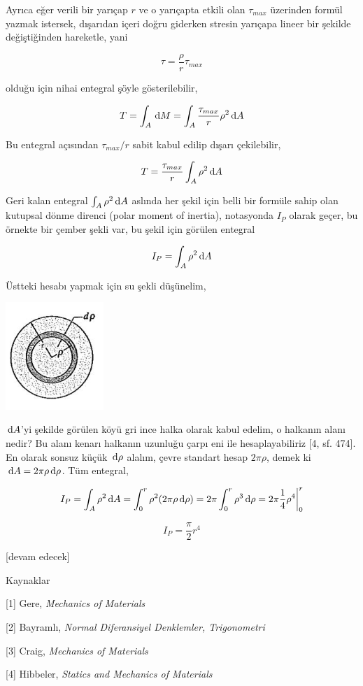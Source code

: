 \documentclass[12pt,fleqn]{article}\usepackage{../../common}
\begin{document}
Ayrıca eğer verili bir yarıçap $r$ ve o yarıçapta etkili olan $\tau_{max}$
üzerinden formül yazmak istersek, dışarıdan içeri doğru giderken stresin
yarıçapa lineer bir şekilde değiştiğinden hareketle, yani

$$
\tau = \frac{\rho}{r} \tau_{max}
$$

olduğu için nihai entegral şöyle gösterilebilir,

$$
T = \int_A \,\mathrm{d} M = \int_A \frac{\tau_{max}}{r} \rho^2 \,\mathrm{d} A
$$

Bu entegral açısından $\tau_{max} / r$ sabit kabul edilip dışarı çekilebilir,

$$
T = \frac{\tau_{max}}{r} \int_A \rho^2 \,\mathrm{d} A
$$

Geri kalan entegral $\int_A \rho^2 \,\mathrm{d} A$ aslında her şekil için belli bir
formüle sahip olan kutupsal dönme direnci (polar moment of inertia), notasyonda
$I_P$ olarak geçer, bu örnekte bir çember şekli var, bu şekil için görülen
entegral

$$
I_P = \int_A \rho^2 \,\mathrm{d} A
$$

Üstteki hesabı yapmak için su şekli düşünelim, 

\includegraphics[width=10em]{phy_020_strs_06_05.jpg}

$\,\mathrm{d} A$'yi şekilde görülen köyü gri ince halka olarak kabul edelim, o halkanın
alanı nedir? Bu alanı kenarı halkanın uzunluğu çarpı eni ile hesaplayabiliriz
[4, sf. 474]. En olarak sonsuz küçük $\,\mathrm{d} \rho$ alalım, çevre standart hesap
$2\pi\rho$, demek ki $\,\mathrm{d} A = 2\pi\rho \,\mathrm{d} \rho$. Tüm entegral,

$$
I_P = \int_A \rho^2 \,\mathrm{d} A =
\int_{0}^{r} \rho^2 (2\pi\rho \,\mathrm{d} \rho) =
2\pi \int_{0}^{r} \rho^3 \,\mathrm{d} \rho =
2\pi \frac{1}{4} \rho^4 \bigg\vert_{0}^{r}
$$


$$
I_P = \frac{\pi}{2} r^4
$$


[devam edecek]

Kaynaklar

[1] Gere, {\em Mechanics of Materials}

[2] Bayramlı, {\em Normal Diferansiyel Denklemler, Trigonometri}

[3] Craig, {\em Mechanics of Materials}

[4] Hibbeler, {\em Statics and Mechanics of Materials}
\end{document}

